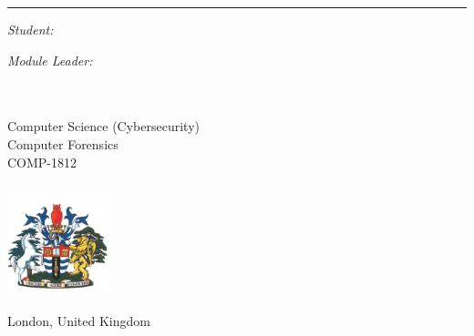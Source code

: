 \begin{titlepage}
  \doublespacing{}
  \large
  \hfill
  \vfill
  \vspace*{0.5cm}
  \begin{center}
    \doublespacing{}
    \textcolor{Blue}{\huge\textbf{\myTitle}}
  \end{center}
  \vspace{1.25cm}
  \hrule
  \vspace{1.5cm}
  \onehalfspacing{}
  \begin{center}

    \begin{minipage}[t]{0.5\textwidth}
      \begin{flushleft}
        \emph{Student:}\\
        \href{\myWebsite}{{\myFirstName} \textsc{\myLastName}}
      \end{flushleft}
    \end{minipage}
    \begin{minipage}[t]{0.4\textwidth}
      \begin{flushright}
        \emph{Module Leader:} \\
        \href{\myProfWebsite}{{\myProfTitle} {\myProfFirstName} \textsc{\myProfLastName}}\\
      \end{flushright}
    \end{minipage}\\[1.5cm]

    Computer Science (Cybersecurity)\\
    Computer Forensics\\
    {COMP-1812}\\[1cm]

    \myDepartment\\
    \myFaculty{}

    \hfill
    \vfill

    \includegraphics[width=3cm]{../../shared/greenwich-coat-of-arms}\\
    \href{https://www.gre.ac.uk/}{\myUni}\\
    London, United Kingdom\\[2em]
    {\mySubmissionMonth} {\mySubmissionYear}
  \end{center}
\end{titlepage}
